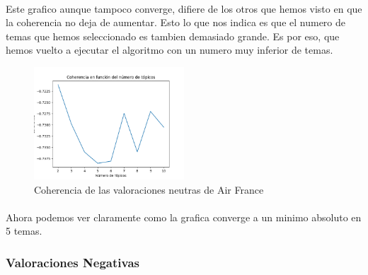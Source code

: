 \documentclass{report}
\begin{document}
                    \paragraph*{}{
                        Este grafico aunque tampoco converge, difiere de los otros que hemos visto en que la coherencia no deja de aumentar.
                        Esto lo que nos indica es que el numero de temas que hemos seleccionado es tambien demasiado grande.
                        Es por eso, que hemos vuelto a ejecutar el algoritmo con un numero muy inferior de temas.
                    }
                    \begin{figure}[H]
                        \centering
                        \includegraphics[width=0.5\textwidth]{./img/air_france_neutras2.png}
                        \caption{Coherencia de las valoraciones neutras de Air France}
                    \end{figure}
                    \paragraph*{}{
                        Ahora podemos ver claramente como la grafica converge a un minimo absoluto en 5 temas.
                    }
                \clearpage\subsubsection*{Valoraciones Negativas}
\end{document}
